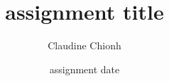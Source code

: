 \documentclass[12pt,a4paper]{scrartcl}
\begin{document}
\subject{subject name}

\title{assignment title}

\author{Claudine Chionh}

\date{assignment date}

\publishers{Lecturer: lecturer name}

\maketitle

\pagestyle{fancy}
 \rhead{\thepage}
\cfoot{}
\thispagestyle{plain}






% 
\end{document}
